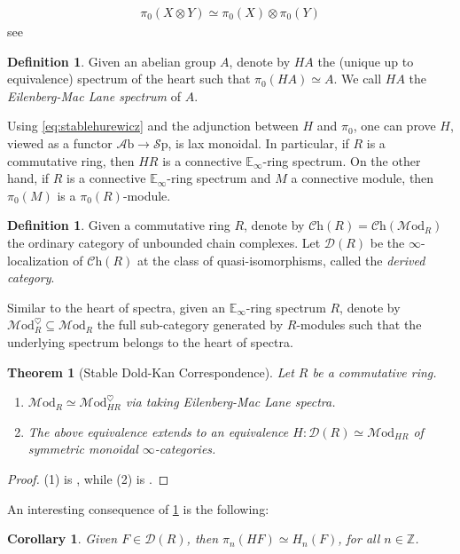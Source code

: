 \documentclass[a4paper]{book}
\newcommand{\lA}{\mathcal{A}}
\newcommand{\lC}{\mathcal{C}}
\newcommand{\lD}{\mathcal{D}}
\newcommand{\bE}{\mathbb{E}}
\newcommand{\lM}{\mathcal{M}}
\newcommand{\lS}{\mathcal{S}}
\newcommand{\bZ}{\mathbb{Z}}
\newcommand{\Sp}{\lS\mathrm{p}} %
\newcommand{\Ab}{\lA\mathrm{b}} %
\newcommand{\Ch}{\lC\mathrm{h}} %
\newcommand{\Mod}{\lM\mathrm{od}} %
\newtheorem{theorem}[equation]{Theorem}
\newtheorem{corollary}[equation]{Corollary}
\theoremstyle{definition}
\newtheorem{definition}[equation]{Definition}
\theoremstyle{remark}
\numberwithin{equation}{section}
\begin{document}
\begin{align}\label{eq:stablehurewicz}
  \pi_0(X\otimes Y)\simeq\pi_0(X)\otimes\pi_0(Y)
\end{align}
see \cite[Theorem 2.3.28]{davies2024atii}

\begin{definition}Given an abelian group $A$, denote by $HA$ the (unique up to equivalence) spectrum of the heart such that $\pi_0(HA)\simeq A$. We call $HA$ the \emph{Eilenberg-Mac Lane spectrum} of $A$.
\end{definition}
Using \cref{eq:stablehurewicz} and the adjunction between $H$ and $\pi_0$, one can prove $H$, viewed as a functor $\Ab\to\Sp$, is lax monoidal. In particular, if $R$ is a commutative ring, then $HR$ is a connective $\bE_\infty$-ring spectrum. On the other hand, if $R$ is a connective $\bE_\infty$-ring spectrum and $M$ a connective module, then $\pi_0(M)$ is a $\pi_0(R)$-module. 
\begin{definition}
  Given a commutative ring $R$, denote by $\Ch(R)=\Ch(\Mod_{R})$ the ordinary category of unbounded chain complexes. Let $\lD(R)$ be the $\infty$-localization of $\Ch(R)$ at the class of quasi-isomorphisms, called the \emph{derived category}.  
\end{definition} 
Similar to the heart of spectra, given an $\bE_\infty$-ring spectrum $R$, denote by $\Mod_{R}^\heartsuit\subseteq \Mod_{R}$ the full sub-category generated by $R$-modules such that the underlying spectrum belongs to the heart of spectra. 
\begin{theorem}[Stable Dold-Kan Correspondence]\label{thm:stabledk}
  Let $R$ be a commutative ring. 
  \begin{enumerate}
    \item $\Mod_{R}\simeq \Mod_{HR}^\heartsuit$ via taking Eilenberg-Mac Lane spectra.
    \item The above equivalence extends to an equivalence $H:\lD(R)\simeq \Mod_{HR}$ of symmetric monoidal $\infty$-categories.
  \end{enumerate} 
\end{theorem}
\begin{proof}
  (1) is \cite[Proposition 7.1.1.13]{lurie2017ha}, while (2) is \cite[Theorem 7.1.2.13]{lurie2017ha}.
\end{proof}
An interesting consequence of \cref{thm:stabledk} is the following:
\begin{corollary}\label{cor:homotopyvshomology}
  Given $F\in\lD(R)$, then $\pi_n(HF)\simeq H_n(F)$, for all $n\in\bZ$.
\end{corollary}
\end{document}
